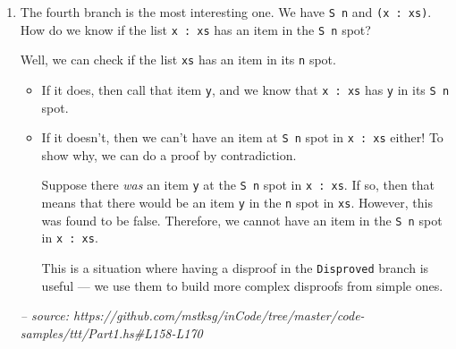 \documentclass[]{article}
\newenvironment{Shaded}{}{}
\newcommand{\CommentTok}[1]{\textcolor[rgb]{0.38,0.63,0.69}{\textit{#1}}}
\newcommand{\DataTypeTok}[1]{\textcolor[rgb]{0.56,0.13,0.00}{#1}}
\newcommand{\FunctionTok}[1]{\textcolor[rgb]{0.02,0.16,0.49}{#1}}
\newcommand{\NormalTok}[1]{#1}
\newcommand{\OtherTok}[1]{\textcolor[rgb]{0.00,0.44,0.13}{#1}}
\begin{document}
\begin{enumerate}
\begin{Shaded}
\end{Shaded}
\item
  The fourth branch is the most interesting one. We have
  \texttt{\textquotesingle{}S\ n} and \texttt{(x\ \textquotesingle{}:\ xs)}. How
  do we know if the list \texttt{x\ \textquotesingle{}:\ xs} has an item in the
  \texttt{\textquotesingle{}S\ n} spot?

  Well, we can check if the list \texttt{xs} has an item in its \texttt{n} spot.

  \begin{itemize}
  \item
    If it does, then call that item \texttt{y}, and we know that
    \texttt{x\ \textquotesingle{}:\ xs} has \texttt{y} in its
    \texttt{\textquotesingle{}S\ n} spot.
  \item
    If it doesn't, then we can't have an item at \texttt{\textquotesingle{}S\ n}
    spot in \texttt{x\ \textquotesingle{}:\ xs} either! To show why, we can do a
    proof by contradiction.

    Suppose there \emph{was} an item \texttt{y} at the
    \texttt{\textquotesingle{}S\ n} spot in \texttt{x\ \textquotesingle{}:\ xs}.
    If so, then that means that there would be an item \texttt{y} in the
    \texttt{n} spot in \texttt{xs}. However, this was found to be false.
    Therefore, we cannot have an item in the \texttt{\textquotesingle{}S\ n}
    spot in \texttt{x\ \textquotesingle{}:\ xs}.

    This is a situation where having a disproof in the \texttt{Disproved} branch
    is useful --- we use them to build more complex disproofs from simple ones.
  \end{itemize}

\begin{Shaded}
\begin{Highlighting}[]
\CommentTok{-- source: https://github.com/mstksg/inCode/tree/master/code-samples/ttt/Part1.hs#L158-L170}


\end{Highlighting}
\end{Shaded}
\end{enumerate}
\end{document}
